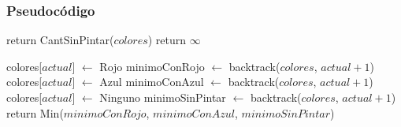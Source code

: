 \subsubsection{Pseudocódigo}

\begin{algorithm}
\begin{algorithmic}


    \State return CantSinPintar($colores$)
  \Else
    \State return $\infty$ 
  \EndIf

\Else

  \State colores[$actual$] $\gets$ Rojo 
  \State minimoConRojo $\gets$ backtrack($colores$, $actual + 1$) \\

  \State colores[$actual$] $\gets$ Azul 
  \State minimoConAzul $\gets$ backtrack($colores$, $actual + 1$) \\

  \State colores[$actual$] $\gets$ Ninguno 
  \State minimoSinPintar $\gets$ backtrack($colores$, $actual + 1$) \\

  \State return Min($minimoConRojo$, $minimoConAzul$, $minimoSinPintar$) 

\EndIf
\EndProcedure
\end{algorithmic}
\end{algorithm}
